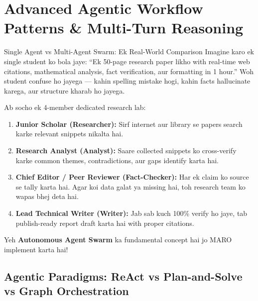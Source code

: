 \documentclass[11pt,a4paper,twoside]{report}
\begin{document}
\chapter{Advanced Agentic Workflow Patterns \& Multi-Turn Reasoning}

\begin{storybox}{Single Agent vs Multi-Agent Swarm: Ek Real-World Comparison}
Imagine karo ek single student ko bola jaye: ``Ek 50-page research paper likho with real-time web citations, mathematical analysis, fact verification, aur formatting in 1 hour.''
Woh student confuse ho jayega --- kahin spelling mistake hogi, kahin facts hallucinate karega, aur structure kharab ho jayega.

Ab socho ek 4-member dedicated research lab:
\begin{enumerate}
    \item \textbf{Junior Scholar (Researcher):} Sirf internet aur library se papers search karke relevant snippets nikalta hai.
    \item \textbf{Research Analyst (Analyst):} Saare collected snippets ko cross-verify karke common themes, contradictions, aur gaps identify karta hai.
    \item \textbf{Chief Editor / Peer Reviewer (Fact-Checker):} Har ek claim ko source se tally karta hai. Agar koi data galat ya missing hai, toh research team ko wapas bhej deta hai.
    \item \textbf{Lead Technical Writer (Writer):} Jab sab kuch 100\% verify ho jaye, tab publish-ready report draft karta hai with proper citations.
\end{enumerate}
Yeh \textbf{Autonomous Agent Swarm} ka fundamental concept hai jo MARO implement karta hai!
\end{storybox}

\section{Agentic Paradigms: ReAct vs Plan-and-Solve vs Graph Orchestration}
\end{document}
